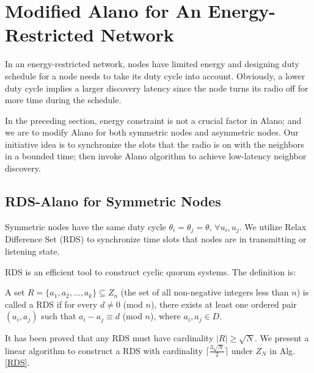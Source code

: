 \section{Modified Alano for An Energy-Restricted Network}
\label{EEN}
In an energy-restricted network, nodes have limited energy and designing duty schedule for a node needs to take its duty cycle into account. Obviously, a lower duty cycle implies a larger discovery latency since the node turns its radio off for more time during the schedule. 

In the preceding section, energy constraint is not a crucial factor in Alano; and we are to modify Alano for both symmetric nodes and asymmetric nodes.
Our initiative idea is to synchronize the slots that the radio is on with the neighbors in a bounded time; then invoke Alano algorithm to achieve low-latency neighbor discovery. 


\subsection{RDS-Alano for Symmetric Nodes}


Symmetric nodes have the same duty cycle $\theta_i = \theta_j = \theta$, $\forall u_i, u_j$. We utilize Relax Difference Set (RDS) to synchronize time slots that nodes are in transmitting or listening state.


RDS is an efficient tool to construct cyclic quorum systems\cite{jiang2005quorum,luk1997two}. The definition is:
\begin{definition}
A set $R=\{a_1,a_2,...,a_k\} \subseteq Z_n$ (the set of all non-negative integers less than $n$)
is called a RDS if for every $d \neq 0$ (mod $n$),
there exists at least one ordered pair $(a_i,a_j)$ such that $a_i - a_j \equiv d$ (mod $n$), where $a_i,a_j \in D$.
\end{definition}


It has been proved that any RDS must have cardinality $|R| \geq \sqrt{N}$\cite{luk1997two}.
We present a linear algorithm to construct a RDS with cardinality $\lceil \frac{3\sqrt{N}}{2}  \rceil$ under $Z_N$ in Alg. \ref{RDS}.


